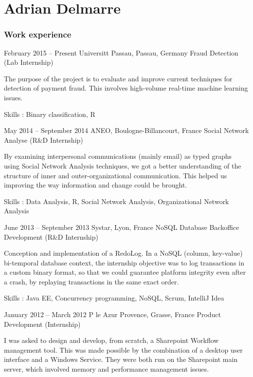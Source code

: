 \documentclass[fontsize=10pt]{tccv}
\begin{document}
\part{Adrian Delmarre}

\section{Work experience}

\begin{eventlist}

\item{February 2015 -- Present}
     {Universitt Passau, Passau, Germany}
     {Fraud Detection (Lab Internship)}

The purpose of the project is to evaluate and improve current techniques for detection of payment fraud. This involves high-volume real-time machine learning issues.

Skills : Binary classification, R

\item{May 2014 -- September 2014}
     {ANEO, Boulogne-Billancourt, France}
     {Social Network Analyse (R&D Internship)}

By examining interpersonal communications (mainly email) as typed graphs using Social Network Analysis techniques, we got a better understanding of the structure of inner and outer-organizational communication. This helped us improving the way information and change could be brought.

Skills : Data Analysis, R, Social Network Analysis, Organizational Network Analysis

\item{June 2013 -- September 2013}
     {Systar, Lyon, France}
     {NoSQL Database Backoffice Development (R&D Internship)}

Conception and implementation of a RedoLog.
In a NoSQL (column, key-value) bi-temporal database context, the internship objective was to log transactions in a custom binary format, so that we could guarantee platform integrity even after a crash, by replaying transactions in the same exact order.

Skills : Java EE, Concurrency programming, NoSQL, Scrum, IntelliJ Idea

\item{January 2012 -- March 2012}
     {P le Azur Provence, Grasse, France}
     {Product Development (Internship)}

I was asked to design and develop, from scratch, a Sharepoint Workflow management tool. This was made possible by the combination of a desktop user interface and a Windows Service. They were both run on the Sharepoint main server, which involved memory and performance management issues.


\end{eventlist}
\end{document}
